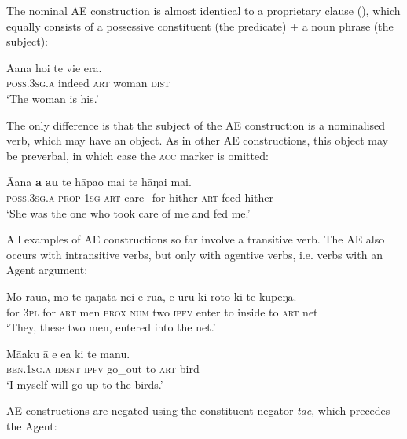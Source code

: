 The nominal AE construction is almost identical to a proprietary clause (), which equally consists of a possessive constituent (the predicate) + a noun phrase (the subject): 

\ea\label{ex:8.104}
\gll {\ꞌ}Ā{\ꞌ}ana ho{\ꞌ}i te vi{\ꞌ}e era. \\
\textsc{poss.3sg.a} indeed \textsc{art} woman \textsc{dist} \\

\glt
‘The woman is his.’ \textstyleExampleref{[R416.1156]}
\z

The only difference is that the subject of the AE construction is a nominalised verb, which may have an object. As in other AE constructions, this object may be preverbal, in which case the \textsc{acc} marker is omitted:

\ea\label{ex:8.105}
\gll {\ꞌ}Ā{\ꞌ}ana \textbf{a} \textbf{au} te hāpa{\ꞌ}o mai te hāŋai mai. \\
\textsc{poss.3sg.a} \textsc{prop} \textsc{1sg} \textsc{art} care\_for hither \textsc{art} feed hither \\

\glt 
‘She was the one who took care of me and fed me.’ \textstyleExampleref{[R310.480]} 
\z

All examples of AE constructions so far involve a transitive verb. The AE also occurs with intransitive verbs, but only with agentive verbs, i.e. verbs with an Agent argument: 

\ea\label{ex:8.106}
\gll Mo rāua, mo te ŋāŋata nei e rua, e uru ki roto ki te kūpeŋa. \\
for \textsc{3pl} for \textsc{art} men \textsc{prox} \textsc{num} two \textsc{ipfv} enter to inside to \textsc{art} net \\

\glt 
‘They, these two men, entered into the net.’ \textstyleExampleref{[R310.265]} 
\z

\ea\label{ex:8.107}
\gll Mā{\ꞌ}aku {\ꞌ}ā e e{\ꞌ}a ki te manu. \\
\textsc{ben.1sg.a} \textsc{ident} \textsc{ipfv} go\_out to \textsc{art} bird \\

\glt 
‘I myself will go up to the birds.’ \textstyleExampleref{[Egt-01.014]}
\z

AE constructions are negated using the constituent negator \textit{ta{\ꞌ}e}, which precedes the Agent:

